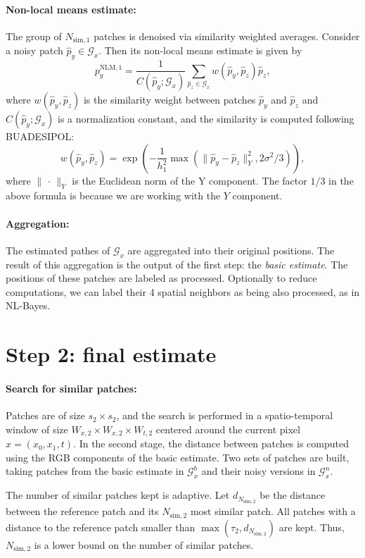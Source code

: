 \documentclass[a4paper,10pt]{article}
\begin{document}
\paragraph{Non-local means estimate:} The group of $N_{\text{sim},1}$ patches
is denoised via similarity weighted averages. Consider a noisy patch $\hat p_y\in \mathcal
G_x$. Then its non-local means estimate is given by
\[p_y^{\text{NLM},1} = \frac1{C(\hat p_y; \mathcal G_x)}\sum_{\hat p_z\in\mathcal G_x} w(\hat p_y, \hat p_z)\hat p_z,\]
where $w(\hat p_y, \hat p_z)$ is the similarity weight between patches $\hat
p_y$ and $\hat p_z$ and $C(\hat p_y; \mathcal G_x)$ is a normalization
constant, and the similarity is computed following BUADESIPOL:
\[w(\hat p_y, \hat p_z) = \exp\left(-\frac1{h_1^2}\max(\|\hat p_y - \hat p_z\|_Y^2, 2\sigma^2/3)\right),\]
where $\|\,\cdot\,\|_Y$ is the Euclidean norm of the Y component. The factor
$1/3$ in the above formula is because we are working with the $Y$
component.

\paragraph{Aggregation:} The estimated pathes of $\mathcal G_x$
are aggregated into their original positions. The result of this aggregation is
the output of the first step: the \emph{basic estimate}. The positions of these
patches are labeled as processed. Optionally to reduce computations, we can label
their 4 spatial neighbors as being also processed, as in NL-Bayes.

\section*{Step 2: final estimate}

\paragraph{Search for similar patches:} Patches are of size
$s_2\times s_2$, and the search is performed in a spatio-temporal window of
size $W_{x,2}\times W_{x,2}\times W_{t,2}$ centered around the current pixel $x
= (x_0, x_1, t)$. In the second stage, the distance between patches is computed
using the RGB components of the basic estimate. Two sets of patches are built,
taking patches from the basic estimate in $\mathcal G^b_x$ and their noisy versions
in $\mathcal G_x^n$.

The number of similar patches kept is adaptive. Let $d_{N_{\text{sim},2}}$
be the distance between the reference patch and its $N_{\text{sim},2}$ most similar patch.
All patches with a distance
to the reference patch smaller than $\max(\tau_2, d_{N_{\text{sim},2}})$ are kept.
Thus, $N_{\text{sim},2}$ is a lower bound on the number of similar patches.
\end{document}
